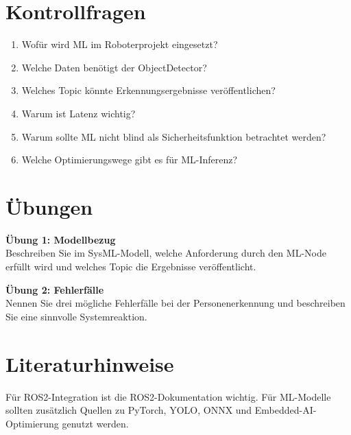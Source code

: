 \section{Kontrollfragen}
\begin{enumerate}
    \item Wofür wird ML im Roboterprojekt eingesetzt?
    \item Welche Daten benötigt der ObjectDetector?
    \item Welches Topic könnte Erkennungsergebnisse veröffentlichen?
    \item Warum ist Latenz wichtig?
    \item Warum sollte ML nicht blind als Sicherheitsfunktion betrachtet werden?
    \item Welche Optimierungswege gibt es für ML-Inferenz?
\end{enumerate}

\section{Übungen}
\begin{uebungbox}
\textbf{Übung 1: Modellbezug}\\
Beschreiben Sie im SysML-Modell, welche Anforderung durch den ML-Node erfüllt wird und welches Topic die Ergebnisse veröffentlicht.
\end{uebungbox}

\begin{uebungbox}
\textbf{Übung 2: Fehlerfälle}\\
Nennen Sie drei mögliche Fehlerfälle bei der Personenerkennung und beschreiben Sie eine sinnvolle Systemreaktion.
\end{uebungbox}

\section{Literaturhinweise}
Für ROS2-Integration ist die ROS2-Dokumentation \cite{ros2docs} wichtig. Für ML-Modelle sollten zusätzlich Quellen zu PyTorch, YOLO, ONNX und Embedded-AI-Optimierung genutzt werden.
